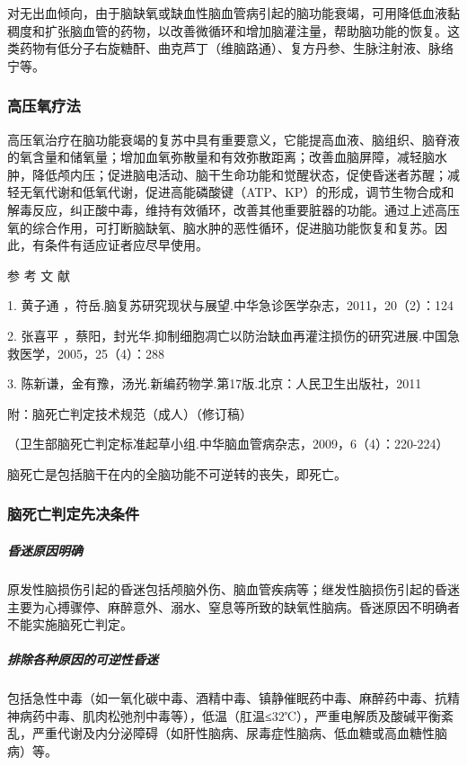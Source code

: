 对无出血倾向，由于脑缺氧或缺血性脑血管病引起的脑功能衰竭，可用降低血液黏稠度和扩张脑血管的药物，以改善微循环和增加脑灌注量，帮助脑功能的恢复。这类药物有低分子右旋糖酐、曲克芦丁（维脑路通）、复方丹参、生脉注射液、脉络宁等。

\subsubsection{高压氧疗法}

高压氧治疗在脑功能衰竭的复苏中具有重要意义，它能提高血液、脑组织、脑脊液的氧含量和储氧量；增加血氧弥散量和有效弥散距离；改善血脑屏障，减轻脑水肿，降低颅内压；促进脑电活动、脑干生命功能和觉醒状态，促使昏迷者苏醒；减轻无氧代谢和低氧代谢，促进高能磷酸键（ATP、KP）的形成，调节生物合成和解毒反应，纠正酸中毒，维持有效循环，改善其他重要脏器的功能。通过上述高压氧的综合作用，可打断脑缺氧、脑水肿的恶性循环，促进脑功能恢复和复苏。因此，有条件有适应证者应尽早使用。

\protect\hypertarget{text00068.html}{}{}

\hypertarget{text00068.htmlux5cux23CHP3-1-4}{}
参 考 文 献

1. 黄子通
，符岳.脑复苏研究现状与展望.中华急诊医学杂志，2011，20（2）：124

2. 张喜平
，蔡阳，封光华.抑制细胞凋亡以防治缺血再灌注损伤的研究进展.中国急救医学，2005，25（4）：288

3. 陈新谦，金有豫，汤光.新编药物学.第17版.北京：人民卫生出版社，2011

\protect\hypertarget{text00069.html}{}{}

\hypertarget{text00069.htmlux5cux23CHP3-1-5}{}
附：脑死亡判定技术规范（成人）（修订稿）

（卫生部脑死亡判定标准起草小组.中华脑血管病杂志，2009，6（4）：220-224）

脑死亡是包括脑干在内的全脑功能不可逆转的丧失，即死亡。

\subsubsection{脑死亡判定先决条件}

\subparagraph{昏迷原因明确}

原发性脑损伤引起的昏迷包括颅脑外伤、脑血管疾病等；继发性脑损伤引起的昏迷主要为心搏骤停、麻醉意外、溺水、窒息等所致的缺氧性脑病。昏迷原因不明确者不能实施脑死亡判定。

\subparagraph{排除各种原因的可逆性昏迷}

包括急性中毒（如一氧化碳中毒、酒精中毒、镇静催眠药中毒、麻醉药中毒、抗精神病药中毒、肌肉松弛剂中毒等），低温（肛温≤32℃），严重电解质及酸碱平衡紊乱，严重代谢及内分泌障碍（如肝性脑病、尿毒症性脑病、低血糖或高血糖性脑病）等。

